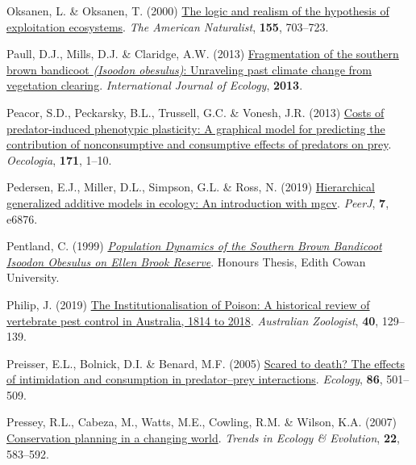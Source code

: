 \documentclass[11pt,a4paper,titlepage,twoside,openright]{style/unimelbthesis}
\newenvironment{CSLReferences}%
  {}%
  {\par}
\begin{document}
\begin{mainmatter}
\begin{CSLReferences}{1}{0}
\leavevmode{}%
Oksanen, L. \& Oksanen, T. (2000) \href{https://doi.org/10.1086/303354}{The logic and realism of the hypothesis of exploitation ecosystems}. \emph{The American Naturalist}, \textbf{155}, 703--723.

\leavevmode{}%
Paull, D.J., Mills, D.J. \& Claridge, A.W. (2013) \href{https://doi.org/10.1155/2013/536524}{Fragmentation of the southern brown bandicoot \emph{({Isoodon obesulus})}: Unraveling past climate change from vegetation clearing}. \emph{International Journal of Ecology}, \textbf{2013}.

\leavevmode{}%
Peacor, S.D., Peckarsky, B.L., Trussell, G.C. \& Vonesh, J.R. (2013) \href{https://doi.org/10.1007/s00442-012-2394-9}{Costs of predator-induced phenotypic plasticity: A graphical model for predicting the contribution of nonconsumptive and consumptive effects of predators on prey}. \emph{Oecologia}, \textbf{171}, 1--10.

\leavevmode{}%
Pedersen, E.J., Miller, D.L., Simpson, G.L. \& Ross, N. (2019) \href{https://doi.org/10.7717/peerj.6876}{Hierarchical generalized additive models in ecology: An introduction with mgcv}. \emph{PeerJ}, \textbf{7}, e6876.

\leavevmode{}%
Pentland, C. (1999) \emph{\href{https://ro.ecu.edu.au/theses_hons/484}{Population Dynamics of the Southern Brown Bandicoot {I}soodon Obesulus on {Ellen Brook Reserve}}}. Honours Thesis, Edith Cowan University.

\leavevmode{}%
Philip, J. (2019) \href{https://doi.org/10.7882/AZ.2018.025}{{The Institutionalisation of Poison: A historical review of vertebrate pest control in {A}ustralia, 1814 to 2018}}. \emph{{A}ustralian Zoologist}, \textbf{40}, 129--139.

\leavevmode{}%
Preisser, E.L., Bolnick, D.I. \& Benard, M.F. (2005) \href{https://doi.org/10.1890/04-0719}{Scared to death? The effects of intimidation and consumption in predator--prey interactions}. \emph{Ecology}, \textbf{86}, 501--509.

\leavevmode{}%
Pressey, R.L., Cabeza, M., Watts, M.E., Cowling, R.M. \& Wilson, K.A. (2007) \href{https://doi.org/10.1016/j.tree.2007.10.001}{Conservation planning in a changing world}. \emph{Trends in Ecology \& Evolution}, \textbf{22}, 583--592.


\end{CSLReferences}
\end{mainmatter}
\end{document}
